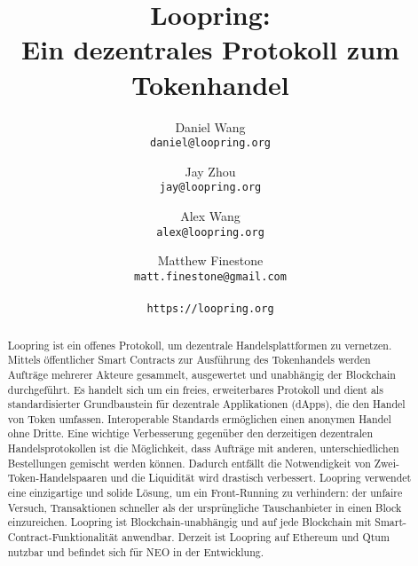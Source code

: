 \documentclass[UTF8,nofonts]{article}
\title{\textbf{Loopring:}\\\textbf{Ein dezentrales Protokoll zum Tokenhandel}}
\author{
 Daniel Wang\\
  \texttt{daniel@loopring.org}\\
  \and
  	Jay Zhou\\
  	\texttt{jay@loopring.org}\\
  	\and
  	Alex Wang\\
  	\texttt{alex@loopring.org}\\
  	\and
  	Matthew Finestone\\
  	\texttt{matt.finestone@gmail.com}\\ 
  \\
  \texttt{https://loopring.org}
 }
\begin{document}
\maketitle


\begin{abstract}
Loopring ist ein offenes Protokoll, um dezentrale Handelsplattformen zu vernetzen. Mittels öffentlicher Smart Contracts zur Ausführung des Tokenhandels werden Aufträge mehrerer Akteure gesammelt, ausgewertet und unabhängig der Blockchain durchgeführt. Es handelt sich um ein freies, erweiterbares Protokoll und dient als standardisierter Grundbaustein für dezentrale Applikationen (dApps), die den Handel von Token umfassen. Interoperable Standards ermöglichen einen anonymen Handel ohne Dritte. Eine wichtige Verbesserung gegenüber den derzeitigen dezentralen Handelsprotokollen ist die Möglichkeit, dass Aufträge mit anderen, unterschiedlichen Bestellungen gemischt werden können. Dadurch entfällt die Notwendigkeit von Zwei-Token-Handelspaaren und die Liquidität wird drastisch verbessert. Loopring verwendet eine einzigartige und solide Lösung, um ein Front-Running zu verhindern: der unfaire Versuch, Transaktionen schneller als der ursprüngliche Tauschanbieter in einen Block einzureichen. Loopring ist Blockchain-unabhängig und auf jede Blockchain mit Smart-Contract-Funktionalität anwendbar. Derzeit ist Loopring auf Ethereum \cite{buterin2017ethereum} \cite{wood2014ethereum} und Qtum \cite{dai2017smart} nutzbar und befindet sich für NEO \cite{atterlonn2018distributed} in der Entwicklung.
\end{abstract}
\end{document}
